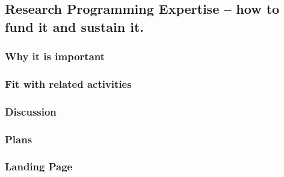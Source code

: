 \subsection{Research Programming Expertise -- how to fund it and sustain it.}

\subsubsection{Why it is important}

\subsubsection{Fit with related activities}

\subsubsection{Discussion}

\subsubsection{Plans}

\subsubsection{Landing Page}
